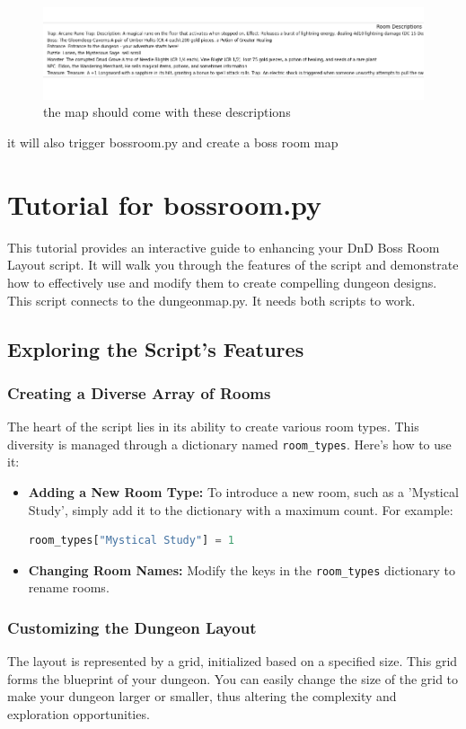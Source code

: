 \documentclass[10pt,twocolumn]{article}
\begin{document}
\begin{figure}
    \centering
    \includegraphics[width=0.5\linewidth]{decs.png}
    \caption{the map should come with these descriptions}
    \label{fig:enter-label}
\end{figure}
it will also trigger bossroom.py and create a boss room map
\section{Tutorial for bossroom.py}
This tutorial provides an interactive guide to enhancing your DnD Boss Room Layout script. It will walk you through the features of the script and demonstrate how to effectively use and modify them to create compelling dungeon designs. This script connects to the dungeonmap.py. It needs both scripts to work.

\subsection{Exploring the Script's Features}
\subsubsection{Creating a Diverse Array of Rooms}
The heart of the script lies in its ability to create various room types. This diversity is managed through a dictionary named \texttt{room\_types}. Here's how to use it:

\begin{itemize}
    \item \textbf{Adding a New Room Type:} To introduce a new room, such as a 'Mystical Study', simply add it to the dictionary with a maximum count. For example:
    \begin{lstlisting}[language=Python]
    room_types["Mystical Study"] = 1
    \end{lstlisting}

    \item \textbf{Changing Room Names:} Modify the keys in the \texttt{room\_types} dictionary to rename rooms.
\end{itemize}

\subsubsection{Customizing the Dungeon Layout}
The layout is represented by a grid, initialized based on a specified size. This grid forms the blueprint of your dungeon. You can easily change the size of the grid to make your dungeon larger or smaller, thus altering the complexity and exploration opportunities.
\end{document}
